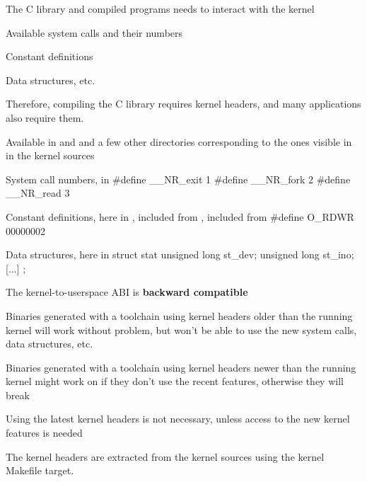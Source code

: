     \startitemize
    \item The C library and compiled programs needs to interact with the kernel
      \startitemize
      \item Available system calls and their numbers
      \item Constant definitions
      \item Data structures, etc.
      \stopitemize
    \item Therefore, compiling the C library requires kernel headers, and many
      applications also require them.
    \item Available in  and  and a few
      other directories corresponding to the ones visible in
       in the kernel sources
    \stopitemize

  \startitemize
  \item System call numbers, in 
\starttyping
#define __NR_exit         1
#define __NR_fork         2
#define __NR_read         3
\stoptyping
  \item Constant definitions, here in ,
    included from , included from
\starttyping
#define O_RDWR 00000002
\stoptyping
\item Data structures, here in 
\starttyping
struct stat {
    unsigned long st_dev;
    unsigned long st_ino;
    [...]
};
\stoptyping
\stopitemize

  \startitemize
  \item The kernel-to-userspace ABI is {\bf backward compatible}
    \startitemize
    \item Binaries generated with a toolchain using kernel headers
      older than the running kernel will work without problem, but
      won't be able to use the new system calls, data structures, etc.
    \item Binaries generated with a toolchain using kernel headers
      newer than the running kernel might work on if they don't use
      the recent features, otherwise they will break
    \item Using the latest kernel headers is not necessary, unless
      access to the new kernel features is needed
    \stopitemize
  \item The kernel headers are extracted from the kernel sources using
    the  kernel Makefile target.
  \stopitemize

